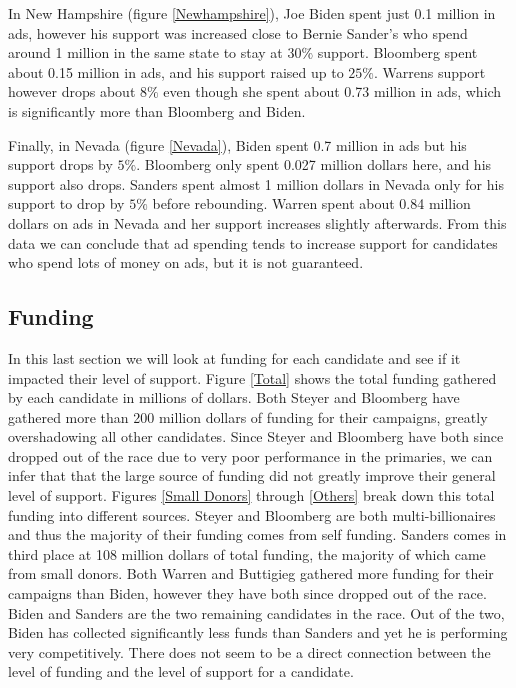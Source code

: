 In New Hampshire (figure \ref{Newhampshire}), Joe Biden spent just 0.1 million in ads, however his support was increased close to Bernie Sander's who spend around 1 million in the same state to stay at $30\%$ support. Bloomberg spent about 0.15 million in ads, and his support raised up to $25\%$. Warrens support however drops about $8\%$ even though she spent about 0.73 million in ads, which is significantly more than Bloomberg and Biden. 

Finally, in Nevada (figure \ref{Nevada}), Biden spent 0.7 million in ads but his support drops by $5\%$. Bloomberg only spent 0.027 million dollars here, and his support also drops. Sanders spent almost 1 million dollars in Nevada only for his support to drop by $5\%$ before rebounding. Warren spent about 0.84 million dollars on ads in Nevada and her support increases slightly afterwards. From this data we can conclude that ad spending tends to increase support for candidates who spend lots of money on ads, but it is not guaranteed.

\subsection{Funding}

In this last section we will look at funding for each candidate and see if it impacted their level of support. Figure \ref{Total} shows the total funding gathered by each candidate in millions of dollars. Both Steyer and Bloomberg have gathered more than 200 million dollars of funding for their campaigns, greatly overshadowing all other candidates. Since Steyer and Bloomberg have both since dropped out of the race due to very poor performance in the primaries, we can infer that that the large source of funding did not greatly improve their general level of support. Figures \ref{Small Donors} through \ref{Others} break down this total funding into different sources. Steyer and Bloomberg are both multi-billionaires and thus the majority of their funding comes from self funding. Sanders comes in third place at 108 million dollars of total funding, the majority of which came from small donors. Both Warren and Buttigieg gathered more funding for their campaigns than Biden, however they have both since dropped out of the race. Biden and Sanders are the two remaining candidates in the race. Out of the two, Biden has collected significantly less funds than Sanders and yet he is performing very competitively. There does not seem to be a direct connection between the level of funding and the level of support for a candidate.
